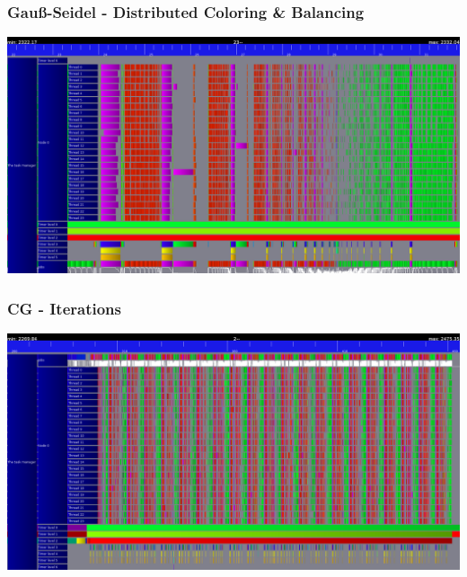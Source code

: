 \documentclass{beamer}
\begin{document}
\begin{frame}
\frametitle{Gau\ss-Seidel - Distributed Coloring \& Balancing}
\includegraphics[width=1\linewidth]{one_iteration.png}
\end{frame}

\begin{frame}
\frametitle{CG - Iterations}
\includegraphics[width=1\linewidth]{iterations_trace.png}
\end{frame}
\end{document}
